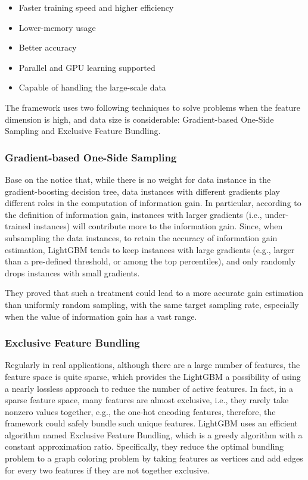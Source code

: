 \begin{itemize}
\item Faster training speed and higher efficiency
\item Lower-memory usage
\item Better accuracy
\item Parallel and GPU learning supported
\item Capable of handling the large-scale data
\end{itemize}

The framework uses two following techniques to solve problems when the feature dimension is high, and data size is considerable: Gradient-based One-Side Sampling and Exclusive Feature Bundling.

\subsubsection{Gradient-based One-Side Sampling}

Base on the notice that, while there is no weight for data instance in the gradient-boosting decision tree, data instances with different gradients play different roles in the computation of information gain. In particular, according to the definition of information gain, instances with larger gradients (i.e., under-trained instances) will contribute more to the information gain. Since, when subsampling the data instances, to retain the accuracy of information gain estimation, LightGBM tends to keep instances with large gradients (e.g., larger than a pre-defined threshold, or among the top percentiles), and only randomly drops instances with small gradients.

They proved that such a treatment could lead to a more accurate gain estimation than uniformly random sampling, with the same target sampling rate, especially when the value of information gain has a vast range.

\subsubsection{Exclusive Feature Bundling}

Regularly in real applications, although there are a large number of features, the feature space is quite sparse, which provides the LightGBM a possibility of using a nearly lossless approach to reduce the number of active features. In fact, in a sparse feature space, many features are almost exclusive, i.e., they rarely take nonzero values together, e.g., the one-hot encoding features, therefore, the framework could safely bundle such unique features. LightGBM uses an efficient algorithm named Exclusive Feature Bundling, which is a greedy algorithm with a constant approximation ratio. Specifically, they reduce the optimal bundling problem to a graph coloring problem by taking features as vertices and add edges for every two features if they are not together exclusive.

